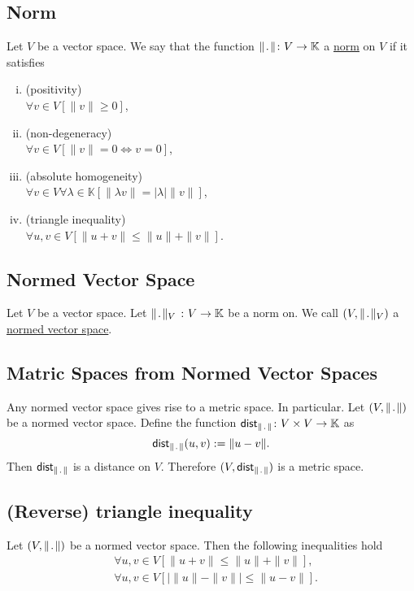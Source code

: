 \subsection{Norm}
\udef Let $V$ be a vector space. We say that the function
$\norm \colon V \to \mathbb{K}$ a \ul{norm} on $V$ if it satisfies
\begin{enumerate}[(i)]
    \item (positivity)\\ $\forall v \in V \left[ \| v \| \geq 0 \right]$,
    \item (non-degeneracy)\\ $\forall v \in V \left[ \| v \| = 0 \iff v = 0 \right]$,
    \item (absolute homogeneity)\\ $\forall v \in V \forall \lambda \in \mathbb{K}
        \left[ \| \lambda v \| = | \lambda | \| v \| \right]$,
    \item (triangle inequality)\\ $\forall u, v \in V \left[ 
        \| u + v \| \leq \| u \| + \| v \| \right]$.
\end{enumerate}


\subsection{Normed Vector Space}
\udef Let $V$ be a vector space.
Let $\norm_V\ \colon V \to \mathbb{K}$ be a norm on.
We call $(V, \norm_V)$ a \ul{normed vector space}.


\subsection{Matric Spaces from Normed Vector Spaces}
\uprop Any normed vector space gives rise to a metric space.
In particular. Let $(V, \norm)$ be a normed vector space. Define
the function $\distnorm \colon V \times V \to \mathbb{K}$ as
\[
    \distnorm(u,v) := \| u - v \|.
\]
Then $\distnorm$ is a distance on $V$. Therefore $(V, \distnorm)$ is a metric space.


\subsection{(Reverse) triangle inequality}
Let $(V, \norm)$ be a normed vector space. 
Then the following inequalities hold
\begin{align*}
    & \forall u,v \in V \left[ \| u + v \| \leq \| u \| + \| v \| \right],\\
    & \forall u,v \in V \left[ | \| u \| - \| v \| | \leq \| u - v \| \right].
\end{align*}

